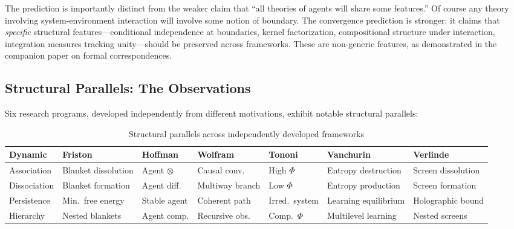 \documentclass[11pt,a4paper]{article}
\theoremstyle{definition}
\theoremstyle{plain}
\theoremstyle{remark}
\begin{document}
The prediction is importantly distinct from the weaker claim that ``all theories of agents will share some features.'' Of course any theory involving system-environment interaction will involve some notion of boundary. The convergence prediction is stronger: it claims that \textit{specific} structural features---conditional independence at boundaries, kernel factorization, compositional structure under interaction, integration measures tracking unity---should be preserved across frameworks. These are non-generic features, as demonstrated in the companion paper on formal correspondences.

\subsection{Structural Parallels: The Observations}\label{sec:parallels}

Six research programs, developed independently from different motivations, exhibit notable structural parallels:

\begin{table}[h]
\centering
\small
\begin{tabular}{lllllll}
\toprule
\textbf{Dynamic} & \textbf{Friston} & \textbf{Hoffman} & \textbf{Wolfram} & \textbf{Tononi} & \textbf{Vanchurin} & \textbf{Verlinde} \\
\midrule
Association & Blanket dissolution & Agent $\otimes$ & Causal conv. & High $\Phi$ & Entropy destruction & Screen dissolution \\
Dissociation & Blanket formation & Agent diff. & Multiway branch & Low $\Phi$ & Entropy production & Screen formation \\
Persistence & Min.\ free energy & Stable agent & Coherent path & Irred.\ system & Learning equilibrium & Holographic bound \\
Hierarchy & Nested blankets & Agent comp. & Recursive obs. & Comp.\ $\Phi$ & Multilevel learning & Nested screens \\
\bottomrule
\end{tabular}
\caption{Structural parallels across independently developed frameworks}
\end{table}
\end{document}
